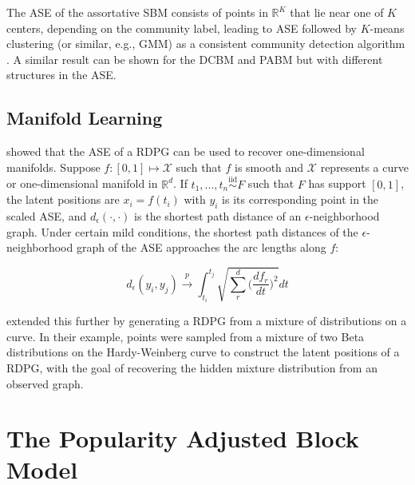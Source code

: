 \documentclass[
  11pt,
]{article}
\begin{document}
The ASE of the assortative SBM consists of points in \(\mathbb{R}^K\)
that lie near one of \(K\) centers, depending on the community label,
leading to ASE followed by \(K\)-means clustering (or similar, e.g.,
GMM) as a consistent community detection algorithm \cite{lyzinski2014}.
A similar result can be shown for the DCBM and PABM but with different
structures in the ASE.

\hypertarget{manifold-learning}{%
\subsection{Manifold Learning}\label{manifold-learning}}

\citet{trosset2020learning} showed that the ASE of a RDPG can be used to
recover one-dimensional manifolds. Suppose
\(f : [0, 1] \mapsto \mathcal{X}\) such that \(f\) is smooth and
\(\mathcal{X}\) represents a curve or one-dimensional manifold in
\(\mathbb{R}^d\). If \(t_1, ..., t_n \stackrel{\text{iid}}{\sim}F\) such
that \(F\) has support \([0, 1]\), the latent positions are
\(x_i = f(t_i)\) with \(y_i\) is its corresponding point in the scaled
ASE, and \(d_{\epsilon}(\cdot, \cdot)\) is the shortest path distance of
an \(\epsilon\)-neighborhood graph. Under certain mild conditions, the
shortest path distances of the \(\epsilon\)-neighborhood graph of the
ASE approaches the arc lengths along \(f\):

\begin{equation}
d_{\epsilon}(y_i, y_j) \stackrel{p}{\to} \int_{t_i}^{t_j} \sqrt{\sum_r^d \Big( \frac{d f_r}{d t} \Big)^2} dt
\end{equation}

\citet{athreya2020estimation} extended this further by generating a RDPG
from a mixture of distributions on a curve. In their example, points
were sampled from a mixture of two Beta distributions on the
Hardy-Weinberg curve to construct the latent positions of a RDPG, with
the goal of recovering the hidden mixture distribution from an observed
graph.

\hypertarget{the-popularity-adjusted-block-model}{%
\section{The Popularity Adjusted Block
Model}\label{the-popularity-adjusted-block-model}}
\end{document}
